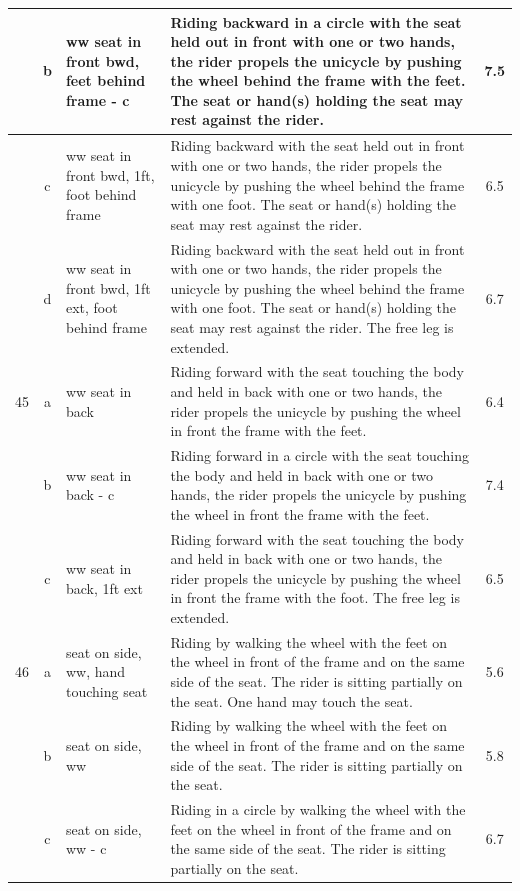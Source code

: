 \begin{longtable}{|r|c|p{4cm}|p{8cm}|c|}
\hline
  & b & ww seat in front bwd, feet behind frame - c & Riding backward in a circle with the seat held out in front with one or two hands, the rider propels the unicycle by pushing the wheel behind the frame with the feet. The seat or hand(s) holding the seat may rest against the rider. & 7.5 \\ 
\hline
  & c & ww seat in front bwd, 1ft, foot behind frame  & Riding backward with the seat held out in front with one or two hands, the rider propels the unicycle by pushing the wheel behind the frame with one foot. The seat or hand(s) holding the seat may rest against the rider. & 6.5 \\ 
\hline
  & d & ww seat in front bwd, 1ft ext, foot behind frame  & Riding backward with the seat held out in front with one or two hands, the rider propels the unicycle by pushing the wheel behind the frame with one foot. The seat or hand(s) holding the seat may rest against the rider. The free leg is extended. & 6.7 \\ 
\hline
45  & a & ww seat in back & Riding forward with the seat touching the body and held in back with one or two hands, the rider propels the unicycle by pushing the wheel in front the frame with the feet.  & 6.4 \\ 
\hline
  & b & ww seat in back - c & Riding forward in a circle with the seat touching the body and held in back with one or two hands, the rider propels the unicycle by pushing the wheel in front the frame with the feet.  & 7.4 \\ 
\hline
  & c & ww seat in back, 1ft ext  & Riding forward with the seat touching the body and held in back with one or two hands, the rider propels the unicycle by pushing the wheel in front the frame with the foot. The free leg is extended.  & 6.5 \\ 
\hline
46  & a & seat on side, ww, hand touching seat  & Riding by walking the wheel with the feet on the wheel in front of the frame and on the same side of the seat. The rider is sitting partially on the seat. One hand may touch the seat. & 5.6 \\ 
\hline
  & b & seat on side, ww  & Riding by walking the wheel with the feet on the wheel in front of the frame and on the same side of the seat. The rider is sitting partially on the seat.  & 5.8 \\ 
\hline
  & c & seat on side, ww - c  & Riding in a circle by walking the wheel with the feet on the wheel in front of the frame and on the same side of the seat. The rider is sitting partially on the seat.  & 6.7 \\ 

\end{longtable}
